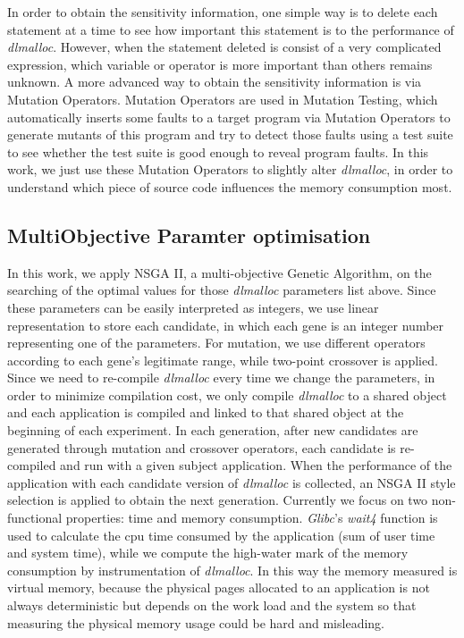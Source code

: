 In order to obtain the sensitivity information, one simple way is to delete each statement at a time to see how important this statement is to the performance of \emph{dlmalloc}. However, when the statement deleted is consist of a very complicated expression, which variable or operator is more important than others remains unknown. A more advanced way to obtain the sensitivity information is via Mutation Operators. Mutation Operators are used in Mutation Testing, which automatically inserts some faults to a target program via Mutation Operators to generate mutants of this program and try to detect those faults using a test suite to see whether the test suite is good enough to reveal program faults. In this work, we just use these Mutation Operators to slightly alter \emph{dlmalloc}, in order to understand which piece of source code influences the memory consumption most.


\subsection{MultiObjective Paramter optimisation}
In this work, we apply NSGA II\cite{996017}, a multi-objective Genetic Algorithm, on the searching of the optimal values for those \emph{dlmalloc} parameters list above.
Since these parameters can be easily interpreted as integers, we use linear representation to store each candidate, in which each gene is an integer number representing one of the parameters. For mutation, we use different operators according to each gene's legitimate range, while two-point crossover is applied.
Since we need to re-compile \emph{dlmalloc} every time we change the parameters, in order to minimize compilation cost, we only compile \emph{dlmalloc} to a shared object and each application is compiled and linked to that shared object at the beginning of each experiment. In each generation, after new candidates are generated through mutation and crossover operators, each candidate is re-compiled and run with a given subject application. When the performance of the application with each candidate version of \emph{dlmalloc} is collected, an NSGA II style selection is applied to obtain the next generation.
Currently we focus on two non-functional properties: time and memory consumption. \emph{Glibc}'s \emph{wait4} function is used to calculate the cpu time consumed by the application (sum of user time and system time), while we compute the high-water mark of the memory consumption by instrumentation of \emph{dlmalloc}. In this way the memory measured is virtual memory, because the physical pages allocated to an application is not always deterministic but depends on the work load and the system so that measuring the physical memory usage could be hard and misleading.
